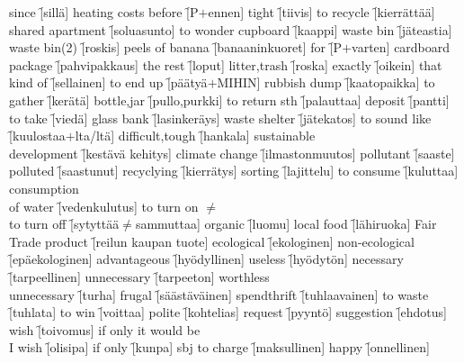 \begin{questions}
\begin{multicols}{3}
    \question since \f[sillä]
    \question heating costs \fillin[lämmityskulut]
    \question before \f[P$+$ennen]
    \question tight  \f[tiivis]
    \question to recycle \f[kierrättää]
    \question shared apartment \f[soluasunto]
    \question to wonder \fillin[ihmetellä]
    \question cupboard \f[kaappi]
    \question waste bin \f[jäteastia]
    \question waste bin(2) \f[roskis]
    \question peels of banana \f[banaaninkuoret]
    \question for \f[P$+$varten]
    \question cardboard package \f[pahvipakkaus]
    \question the rest \f[loput]
    \question litter,trash \f[roska]
    \question exactly \f[oikein]
    \question that kind of \f[sellainen]
    \question to end up \f[päätyä$+$MIHIN]
    \question rubbish dump \f[kaatopaikka]
    \question to gather \f[kerätä]
    \question bottle,jar \f[pullo,purkki]
    \question to return sth \f[palauttaa]
    \question deposit \f[pantti]
    \question to take \f[viedä]
    \question glass bank \f[lasinkeräys]
    \question waste shelter \f[jätekatos]
    \question to sound like \f[kuulostaa$+$lta/ltä]
    \question difficult,tough \f[hankala]
    \question sustainable\\development \f[kestävä kehitys]
    \question climate change \f[ilmastonmuutos]
    \question pollutant \f[saaste]
    \question polluted \f[saastunut]
    \question recyclying \f[kierrätys]
    \question sorting \f[lajittelu]
    \question to consume \f[kuluttaa]
    \question consumption\\of water \f[vedenkulutus]
    \question to turn on $\neq$\\ to turn off \f[sytyttää$\neq$sammuttaa]
    \question organic \f[luomu]
    \question local food \f[lähiruoka]
    \question Fair Trade product \f[reilun kaupan tuote]
    \question ecological \f[ekologinen]
    \question non-ecological \f[epäekologinen]
    \question advantageous \f[hyödyllinen]
    \question useless \f[hyödytön]
    \question necessary \f[tarpeellinen]
    \question unnecessary \f[tarpeeton]
    \question worthless\\unnecessary \f[turha]
    \question frugal \f[säästäväinen]
    \question spendthrift \f[tuhlaavainen]
    \question to waste \f[tuhlata]
    \question to win \f[voittaa]
    \question polite \f[kohtelias]
    \question request \f[pyyntö]
    \question suggestion \f[ehdotus]
    \question wish \f[toivomus]
    \question if only it would be\\I wish \f[olisipa]
    \question if only \f[kunpa]
    \question sbj to charge \f[maksullinen]
    \question happy \f[onnellinen]

\end{multicols}
\end{questions}
